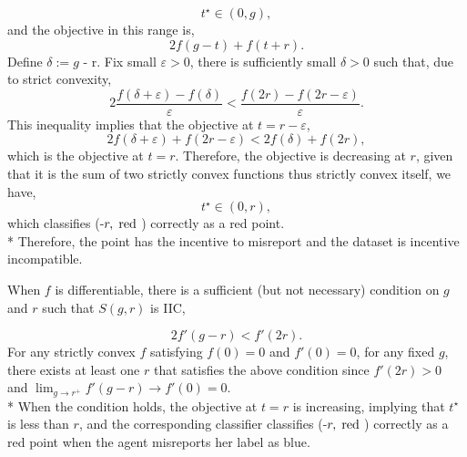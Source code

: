 \documentclass{article}
\begin{document}
\begin{equation} 
t^\star  \in \left(0, g \right),
\end{equation}
and the objective in this range is,
\begin{equation} 
2 f\left(g - t\right) + f\left(t + r\right).
\end{equation}
Define $\delta := g$ - r. Fix small $\varepsilon > 0$, there is sufficiently small $\delta > 0$ such that, due to strict convexity,
\begin{equation} 
2 \dfrac{f\left(\delta + \varepsilon\right) - f\left(\delta\right)}{\varepsilon} < \dfrac{f\left(2 r\right) - f\left(2 r - \varepsilon\right)}{\varepsilon} .
\end{equation}
This inequality implies that the objective at $t  = r  - \varepsilon$,
\begin{equation} 
2 f\left(\delta + \varepsilon\right) + f\left(2 r - \varepsilon\right) < 2 f\left(\delta\right) + f\left(2 r \right),
\end{equation}
which is the objective at $t  = r $. Therefore, the objective is decreasing at $r $, given that it is the sum of two strictly convex functions thus strictly convex itself, we have,
\begin{equation} 
t^\star  \in \left(0, r \right),
\end{equation}
which classifies (-$r , \text{\;red\;}$) correctly as a red point.
\\* Therefore, the point has the incentive to misreport and the dataset is incentive incompatible.
\newline \newline
\begin{eg} \label{eg:ex1df} 
When $f $ is differentiable, there is a sufficient (but not necessary) condition on $g $ and $r $ such that $S\left(g, r \right) $ is IIC,
\end{eg}
\begin{equation} 
2 f'\left(g - r\right) < f'\left(2 r\right).
\end{equation}
For any strictly convex $f $ satisfying $f\left(0\right)  = 0$ and $f'\left(0\right)  = 0$, for any fixed $g $, there exists at least one $r $ that satisfies the above condition since $f'\left(2 r\right)  > 0$ and $\lim_{g \to  r^{+}} f'\left(g - r\right) \to  f'\left(0\right) = 0$.
\\* When the condition holds, the objective at $t  = r $ is increasing, implying that $t^\star $ is less than $r $, and the corresponding classifier classifies (-$r , \text{\;red\;}$) correctly as a red point when the agent misreports her label as blue.
\end{document}
